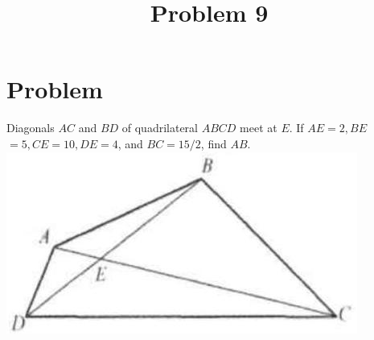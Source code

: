 \documentclass{article}
\title{Problem 9}
\date{}
\begin{document}
\maketitle

\section*{Problem}
Diagonals \(A C\) and \(B D\) of quadrilateral \(A B C D\) meet at \(E\). If \(A E=2, B E\) \(=5, C E=10, D E=4\), and \(B C=15 / 2\), find \(A B\).\\
\centering
\includegraphics[width=\textwidth]{images/problem_image_1.jpg}
\end{document}

